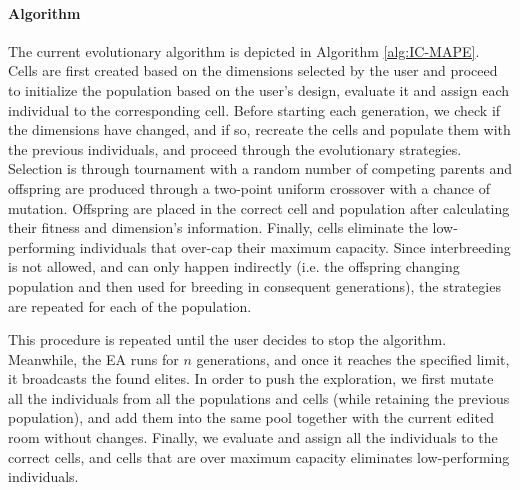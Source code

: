 \paragraph{Algorithm}

The current evolutionary algorithm is depicted in Algorithm \ref{alg:IC-MAPE}. Cells are first created based on the dimensions selected by the user and proceed to initialize the population based on the user's design, evaluate it and assign each individual to the corresponding cell. Before starting each generation, we check if the dimensions have changed, and if so, recreate the cells and populate them with the previous individuals, and proceed through the evolutionary strategies. Selection is through tournament with a random number of competing parents and offspring are produced through a two-point uniform crossover with a chance of mutation. Offspring are placed in the correct cell and population after calculating their fitness and dimension's information. Finally, cells eliminate the low-performing individuals that over-cap their maximum capacity. Since interbreeding is not allowed, and can only happen indirectly (i.e. the offspring changing population and then used for breeding in consequent generations), the strategies are repeated for each of the population.

This procedure is repeated until the user decides to stop the algorithm. Meanwhile, the EA runs for $n$ generations, and once it reaches the specified limit, it broadcasts the found elites. In order to push the exploration, we first mutate all the individuals from all the populations and cells (while retaining the previous population), and add them into the same pool together with the current edited room without changes. Finally, we evaluate and assign all the individuals to the correct cells, and cells that are over maximum capacity eliminates low-performing individuals.



